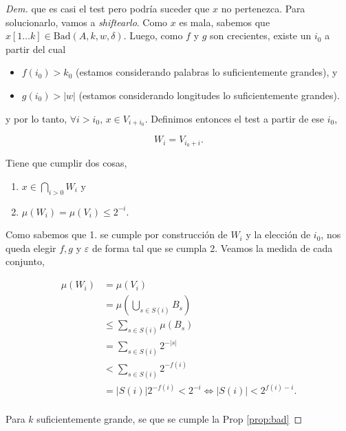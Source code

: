 \documentclass{article}
\theoremstyle{definition} %
\newcommand{\first}[2]{#2[1 \dots #1]}
\newcommand{\measure}[1]{\mu\left(#1\right)}
\newcommand{\size}[1]{\left|#1\right|}
\newcommand{\Bad}[4]{\text{Bad}(#1, #2, #3, #4)}
\begin{document}
\begin{proof}[Dem]
    que es casi el test pero podría suceder que $x$ no pertenezca. Para
    solucionarlo, vamos a \textit{shiftearlo}. Como $x$ es mala, sabemos que
    $\first{k}{x} \in \Bad{A}{k}{w}{\delta}$. Luego, como $f$ y $g$ son
    crecientes, existe un $i_0$ a partir del cual
    \begin{itemize}
        \item $f(i_0) > k_0$ (estamos considerando palabras lo suficientemente
        grandes), y
        \item $g(i_0) > |w|$ (estamos considerando longitudes lo suficientemente
        grandes).
    \end{itemize}

    y por lo tanto, $\forall i > i_0$, $x \in V_{i+i_0}$. Definimos entonces el test a partir de ese $i_0$,

    \[
        W_i = V_{i_0 + i}.
    \]

    Tiene que cumplir dos cosas,

    \begin{enumerate}
        \item $x \in \bigcap_{i > 0} W_i$ y
        \item $\measure{W_i} = \measure{V_i} \leq 2^{-i}$.
    \end{enumerate}

    Como sabemos que 1. se cumple por construcción de $W_i$ y la elección de
    $i_0$, nos queda elegir $f, g$ y $\varepsilon$ de forma tal que se cumpla 2.
    Veamos la medida de cada conjunto,

    \begin{align*}
        \measure{W_i}
            &= \measure{V_i}\\
            &= \measure{\bigcup_{s\in S(i)} B_s}\\
            &\leq \sum_{s \in S(i)} \measure{B_s}\\
            &= \sum_{s \in S(i)} 2^{-|s|}\\
            &< \sum_{s \in S(i)} 2^{-f(i)}\\
            &=\size{S(i)} 2^{-f(i)} < 2^{-i} \iff \size{S(i)} < 2^{f(i) - i}.\\
    \end{align*}

    Para $k$ suficientemente grande, se que se cumple la Prop \ref{prop:bad}


\end{proof}
\end{document}
